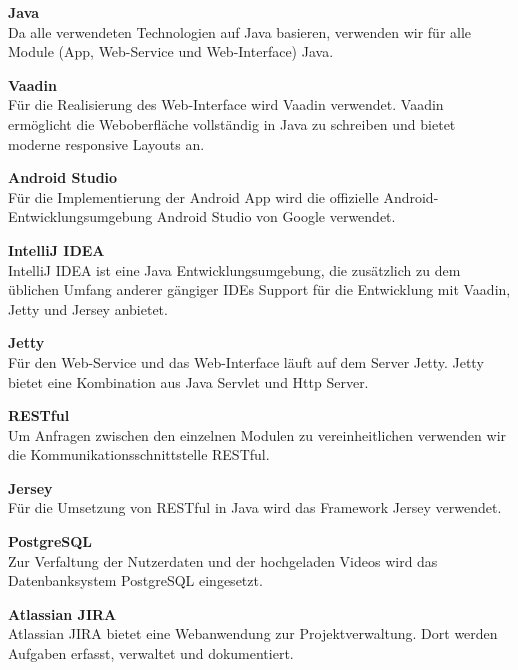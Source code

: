 \begin{description}
\item \textbf{Java} \hfill \\
Da alle verwendeten Technologien auf Java basieren, verwenden wir für alle Module (App, Web-Service und Web-Interface) Java.

\item \textbf{Vaadin} \hfill \\
Für die Realisierung des Web-Interface wird Vaadin verwendet. Vaadin ermöglicht die Weboberfläche vollständig in Java zu schreiben und bietet moderne responsive Layouts an.

\item \textbf{Android Studio} \hfill \\
Für die Implementierung der Android App wird die offizielle Android-Entwicklungsumgebung Android Studio von Google verwendet.

\item \textbf{IntelliJ IDEA} \hfill \\
IntelliJ IDEA ist eine Java Entwicklungsumgebung, die zusätzlich zu dem üblichen Umfang anderer gängiger IDEs Support für die Entwicklung mit Vaadin, Jetty und Jersey anbietet.

\item \textbf{Jetty} \hfill \\
Für den Web-Service und das Web-Interface läuft auf dem Server Jetty. Jetty bietet eine Kombination aus Java Servlet und Http Server.

\item \textbf{RESTful} \hfill \\
Um Anfragen zwischen den einzelnen Modulen zu vereinheitlichen verwenden wir die Kommunikationsschnittstelle RESTful.

\item \textbf{Jersey} \hfill \\
Für die Umsetzung von RESTful in Java wird das Framework Jersey verwendet.

\item \textbf{PostgreSQL} \hfill \\
Zur Verfaltung der Nutzerdaten und der hochgeladen Videos wird das Datenbanksystem PostgreSQL eingesetzt.

\item \textbf{Atlassian JIRA} \hfill \\
Atlassian JIRA bietet eine Webanwendung zur Projektverwaltung. Dort werden Aufgaben erfasst, verwaltet und dokumentiert.


\end{description}
